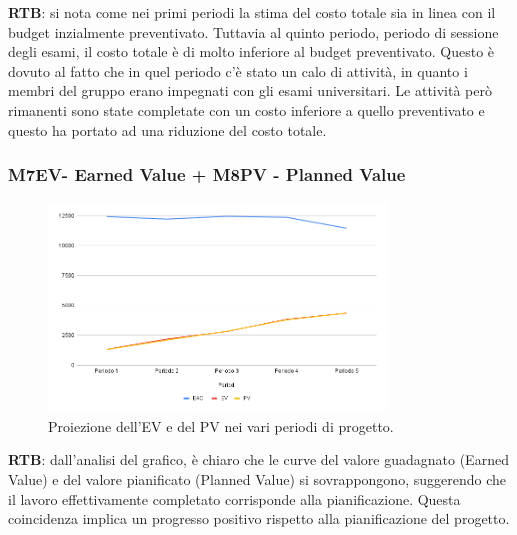 \textbf{RTB}: si nota come nei primi periodi la stima del costo totale sia in linea con il budget inzialmente preventivato. Tuttavia al quinto periodo, periodo di sessione degli esami, il costo totale è di molto inferiore al budget preventivato. Questo è dovuto al fatto che in quel periodo c'è stato un calo di attività, in quanto i membri del gruppo erano impegnati con gli esami universitari. Le attività però rimanenti sono state completate con un costo inferiore a quello preventivato e questo ha portato ad una riduzione del costo totale.\\

\subsubsection{M7EV- Earned Value + M8PV - Planned Value} 
\begin{figure}[H]
    \centering
    \includegraphics[width=0.8\textwidth]{../Images/PianoDiQualifica/EV_PV.png}
    \caption{Proiezione dell’EV e del PV nei vari periodi di progetto.}
    \label{fig:3}
\end{figure}

\textbf{RTB}: dall'analisi del grafico, è chiaro che le curve del valore guadagnato (Earned Value) e del valore pianificato (Planned Value) si sovrappongono, suggerendo che il lavoro effettivamente completato corrisponde alla pianificazione. Questa coincidenza implica un progresso positivo rispetto alla pianificazione del progetto.

